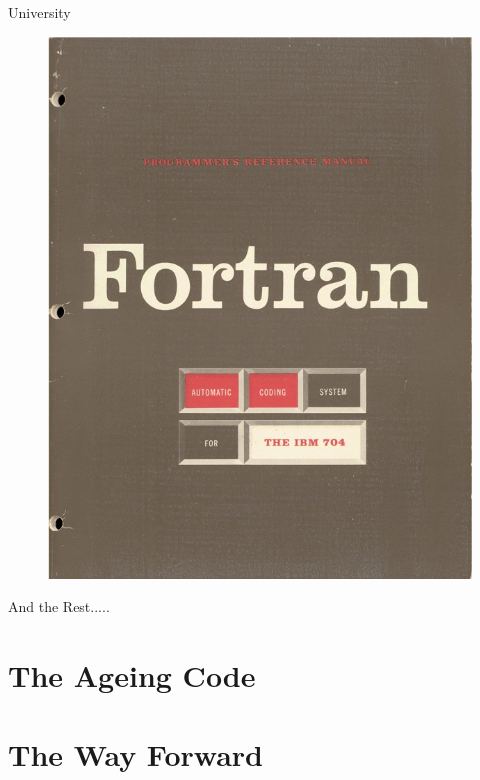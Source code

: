 \documentclass{beamer}
\begin{document}
\begin{frame}{University}
\begin{figure}
      \includegraphics[scale=0.1]{images/fortran}
    \end{figure}
  \end{frame}

  \begin{frame}{And the Rest.....}

  \end{frame}

\section{The Ageing Code}

\section{The Way Forward}
\end{document}
